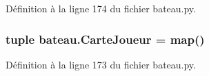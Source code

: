 Définition à la ligne 174 du fichier bateau.\-py.

\hypertarget{namespacebateau_a924cee8dc4435fc03e905904c31dbcf7}{
\subsubsection[{Carte\-Joueur}]{\setlength{\rightskip}{0pt plus 5cm}tuple bateau.\-Carte\-Joueur = {\bf map}()}}\label{namespacebateau_a924cee8dc4435fc03e905904c31dbcf7}


Définition à la ligne 173 du fichier bateau.\-py.

